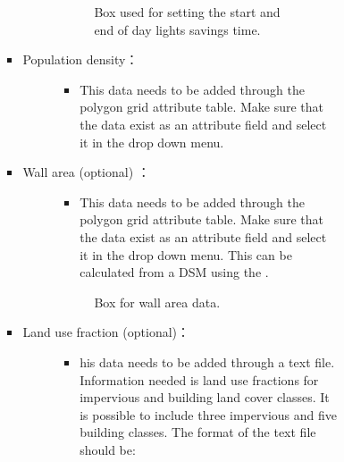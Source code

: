 \documentclass[letterpaper,10pt,english]{sphinxmanual}
\begin{document}
\begin{itemize}
\begin{description}
\begin{itemize}
\begin{description}
\begin{itemize}
\begin{description}
\begin{figure}[htbp]
\noindent{}
\caption{Box used for setting the start and end of day lights savings time.}\label{\detokenize{pre-processor/SUEWS Prepare:id7}}\end{figure}

\end{description}

\item {} \begin{description}
\item[{Population density：}] \leavevmode\begin{itemize}
\item {} 
This data needs to be added through the polygon grid attribute table. Make sure that the data exist as an attribute field and select it in the drop down menu.

\end{itemize}

\end{description}

\item {} \begin{description}
\item[{Wall area (optional) ：}] \leavevmode\begin{itemize}
\item {} 
This data needs to be added through the polygon grid attribute table. Make sure that the data exist as an attribute field and select it in the drop down menu. This can be calculated from a DSM using the {\hyperref[\detokenize{pre-processor/Urban Geometry Wall Height and Aspect:wallheightandaspect}]{}}.

\end{itemize}

\begin{figure}[htbp]
\centering
\capstart

\noindent{}
\caption{Box for wall area data.}\label{\detokenize{pre-processor/SUEWS Prepare:id8}}\end{figure}

\end{description}

\item {} \begin{description}
\item[{Land use fraction (optional)：}] \leavevmode\begin{itemize}
\item {} 
his data needs to be added through a text file. Information needed is land use fractions for impervious and building land cover classes. It is possible to include three impervious and five building classes. The format of the text file should be:


\end{itemize}
\end{description}
\end{itemize}
\end{description}
\end{itemize}
\end{description}
\end{itemize}
\end{document}
